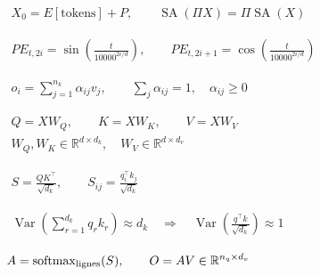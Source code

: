\documentclass[border=4pt,multi=preview]{standalone}
\begin{document}
\begin{preview}\color{ink}\fontsize{24}{30}\selectfont
$\displaystyle \begin{gathered}X_0=E[\text{tokens}]+P,\qquad\operatorname{SA}(\Pi X)=\Pi\operatorname{SA}(X)\end{gathered}$
\end{preview}
\begin{preview}\color{ink}\fontsize{24}{30}\selectfont
$\displaystyle \begin{gathered}PE_{t,2i}=\sin\!\left(\frac{t}{10000^{2i/d}}\right),\qquad PE_{t,2i+1}=\cos\!\left(\frac{t}{10000^{2i/d}}\right)\end{gathered}$
\end{preview}
\begin{preview}\color{ink}\fontsize{24}{30}\selectfont
$\displaystyle \begin{gathered}o_i=\sum_{j=1}^{n_k}\alpha_{ij}v_j,\qquad\sum_j\alpha_{ij}=1,\quad\alpha_{ij}\ge0\end{gathered}$
\end{preview}
\begin{preview}\color{ink}\fontsize{24}{30}\selectfont
$\displaystyle \begin{gathered}Q=XW_Q,\qquad K=XW_K,\qquad V=XW_V\\W_Q,W_K\in\mathbb R^{d\times d_k},\quad W_V\in\mathbb R^{d\times d_v}\end{gathered}$
\end{preview}
\begin{preview}\color{ink}\fontsize{24}{30}\selectfont
$\displaystyle \begin{gathered}S=\frac{QK^\top}{\sqrt{d_k}},\qquad S_{ij}=\frac{q_i^\top k_j}{\sqrt{d_k}}\end{gathered}$
\end{preview}
\begin{preview}\color{ink}\fontsize{24}{30}\selectfont
$\displaystyle \begin{gathered}\operatorname{Var}\!\left(\sum_{r=1}^{d_k}q_rk_r\right)\approx d_k\quad\Longrightarrow\quad\operatorname{Var}\!\left(\frac{q^\top k}{\sqrt{d_k}}\right)\approx1\end{gathered}$
\end{preview}
\begin{preview}\color{ink}\fontsize{24}{30}\selectfont
$\displaystyle \begin{gathered}A=\operatorname{softmax}_{\rm lignes}(S),\qquad O=AV\in\mathbb R^{n_q\times d_v}\end{gathered}$
\end{preview}
\end{document}
